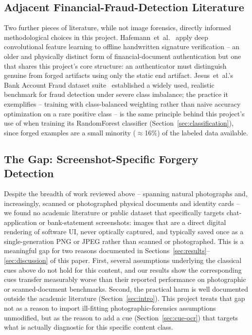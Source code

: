 \documentclass[conference]{IEEEtran}
\newcommand{\code}[1]{\path{#1}}
\begin{document}
\subsection{Adjacent Financial-Fraud-Detection Literature}
Two further pieces of literature, while not image forensics, directly
informed methodological choices in this project.
Hafemann~et~al.~\cite{hafemann2017learning} apply deep convolutional feature
learning to offline handwritten signature verification -- an older and
physically distinct form of financial-document authentication but one that
shares this project's core structure: an authenticator must distinguish
genuine from forged artifacts using only the static end artifact.
Jesus~et~al.'s Bank Account Fraud dataset suite~\cite{jesus2022turning}
established a widely used, realistic benchmark for fraud detection under
severe class imbalance; the practice it exemplifies -- training with
class-balanced weighting rather than naive accuracy optimization on a rare
positive class -- is the same principle behind this project's use of
\code{class_weight="balanced"} when training its RandomForest classifier
(Section~\ref{sec:classification}), since forged examples are a small
minority ($\approx$16\%) of the labeled data available.

\subsection{The Gap: Screenshot-Specific Forgery Detection}
\label{sec:gap}
Despite the breadth of work reviewed above -- spanning natural photographs
and, increasingly, scanned or photographed physical documents and identity
cards -- we found no academic literature or public dataset that specifically
targets chat-application or bank-statement screenshots: images that are a
direct digital rendering of software UI, never optically captured, and
typically saved once as a single-generation PNG or JPEG rather than scanned
or photographed. This is a meaningful gap for two reasons documented in
Sections~\ref{sec:results}--\ref{sec:discussion} of this paper. First,
several assumptions underlying the classical cues above do not hold for this
content, and our results show the corresponding cues transfer measurably
worse than their reported performance on photographic or scanned-document
benchmarks. Second, the practical harm is well documented outside the
academic literature (Section~\ref{sec:intro}). This project treats that gap
not as a reason to import ill-fitting photographic-forensics assumptions
unmodified, but as the reason to add a cue (Section~\ref{sec:cue-ocr}) that
targets what is actually diagnostic for this specific content class.
\end{document}
